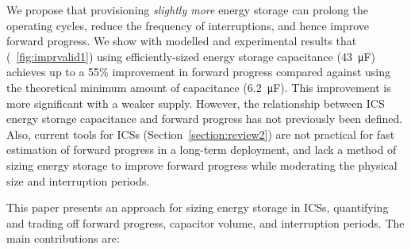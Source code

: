 We propose that provisioning \textit{slightly more} energy storage can prolong the operating cycles, reduce the frequency of interruptions, and hence improve forward progress. We show with modelled and experimental results that (\figurename{~\ref{fig:imprvalid1}}) using efficiently-sized energy storage capacitance (\SI{43}{\micro\farad}) achieves up to a 55\% improvement in forward progress compared against using the theoretical minimum amount of capacitance (\SI{6.2}{\micro\farad}). This improvement is more significant with a weaker supply. 
However, the relationship between ICS energy storage capacitance and forward progress has not previously been defined. Also, current tools for ICSs (Section~\ref{section:review2}) are not practical for fast estimation of forward progress in a long-term deployment, and lack a method of sizing energy storage to improve forward progress while moderating the physical size and interruption periods. 

This paper presents an approach for sizing energy storage in ICSs, quantifying and trading off forward progress, capacitor volume, and interruption periods. The main contributions are:




